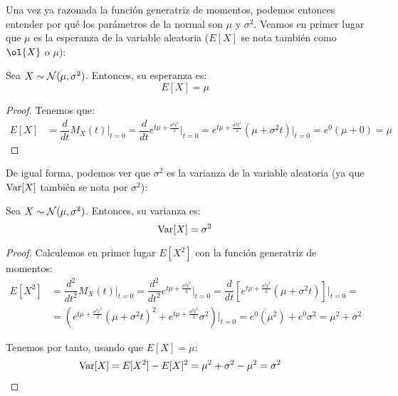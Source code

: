 Una vez ya razonada la función generatriz de momentos, podemos entonces entender por qué los parámetros de la normal son $\mu$ y $\sigma^2$.
Veamos en primer lugar que $\mu$ es la esperanza de la variable aleatoria ($E[X]$ se nota también como $\ol{X}$ o $\mu$):
\begin{prop}
    Sea $X\sim \mathcal{N}(\mu,\sigma^2)$. Entonces, su esperanza es:
    \begin{equation*}
        E[X] = \mu
    \end{equation*}
\end{prop}
\begin{proof}
    Tenemos que:
    \begin{align*}
        E[X] &= \dfrac{d}{dt} M_X(t) \Big|_{t=0} = \dfrac{d}{dt} e^{t\mu + \frac{\sigma^2 t^2}{2}} \Big|_{t=0}
        = e^{t\mu + \frac{\sigma^2 t^2}{2}}\left(\mu + \sigma^2 t\right) \Big|_{t=0} = e^{0}(\mu + 0) = \mu
    \end{align*}
\end{proof}

De igual forma, podemos ver que $\sigma^2$ es la varianza de la variable aleatoria (ya que $\operatorname{Var}[X]$ también se nota por $\sigma^2$):
\begin{prop}
    Sea $X\sim \mathcal{N}(\mu,\sigma^2)$. Entonces, su varianza es:
    \begin{equation*}
        \operatorname{Var}[X] = \sigma^2
    \end{equation*}
\end{prop}
\begin{proof}
    Calculemos en primer lugar $E[X^2]$ con la función generatriz de momentos:
    \begin{align*}
        E[X^2] &= \dfrac{d^2}{dt^2} M_X(t) \Big|_{t=0} = \dfrac{d^2}{dt^2} e^{t\mu + \frac{\sigma^2 t^2}{2}} \Big|_{t=0}
        = \dfrac{d}{dt} \left[e^{t\mu + \frac{\sigma^2 t^2}{2}}(\mu + \sigma^2 t)\right] \Big|_{t=0} =\\
        &= \left(e^{t\mu + \frac{\sigma^2 t^2}{2}}\left(\mu + \sigma^2 t\right)^2 + e^{t\mu + \frac{\sigma^2 t^2}{2}}\sigma^2\right) \Big|_{t=0}
        = e^{0}(\mu^2) + e^{0}\sigma^2 = \mu^2 + \sigma^2
    \end{align*}

    Tenemos por tanto, usando que $E[X] = \mu$:
    \begin{align*}
        \operatorname{Var}[X] &= E[X^2] - E[X]^2 = \mu^2 + \sigma^2 - \mu^2 = \sigma^2
    \end{align*}
\end{proof}

